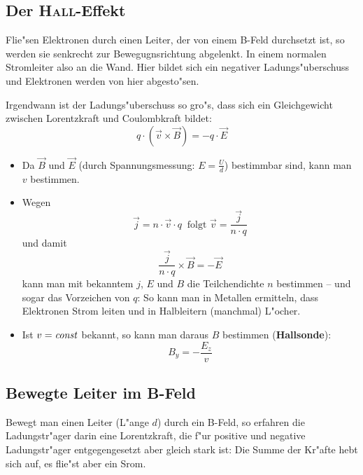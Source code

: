 \subsection{Der \textsc{Hall}-Effekt}
\label{kap_hall-effekt}

Flie"sen Elektronen durch einen Leiter, der von einem B-Feld durchsetzt
ist, so werden sie senkrecht zur Bewegugnsrichtung abgelenkt. In einem
normalen Stromleiter also an die Wand. Hier bildet sich ein negativer
Ladungs"uberschuss und Elektronen werden von hier abgesto"sen.

Irgendwann ist der Ladungs"uberschuss so gro"s, dass sich ein
Gleichgewicht zwischen Lorentzkraft und Coulombkraft bildet:
\begin{equation}
   \label{eqn_gg_EB}
   q \cdot (\vec v \times \vec B) = - q \cdot \vec E
\end{equation}

\begin{itemize}
\item Da $\vec B$ und $\vec E$ (durch Spannungsmessung: $E = \frac{U}{d}$)
bestimmbar sind, kann man $v$ bestimmen.
\item Wegen
\begin{equation*}
   \vec j = n \cdot \vec v \cdot q ~\text{ folgt } \vec v = \frac{
     \vec j}{n \cdot q}
\end{equation*}
und damit
\begin{equation}
   \label{eq:319}
   \frac{\vec j}{n \cdot q} \times \vec B = - \vec E
\end{equation}
kann man mit bekanntem $j$, $E$ und $B$ die Teilchendichte $n$
bestimmen -- und sogar das Vorzeichen von $q$: So kann man in Metallen
ermitteln, dass Elektronen Strom leiten und in Halbleitern (manchmal) L"ocher.
\item Ist $v = \text{\emph{const}}$ bekannt, so kann man daraus $B$ bestimmen
   (\textbf{Hallsonde}):
   \begin{equation}
      \label{eq:320}
      B_y = - \frac{E_z}{v}
   \end{equation}
\end{itemize}




\subsection{Bewegte Leiter im B-Feld}
\label{kap_bewegte-leiter-im-b-feld}

Bewegt man einen Leiter (L"ange $d$) durch ein B-Feld, so erfahren die
Ladungstr"ager darin eine Lorentzkraft, die f"ur positive und negative
Ladungstr"ager entgegengesetzt aber gleich stark ist: Die Summe der
Kr"afte hebt sich auf, es flie"st aber ein Srom.

